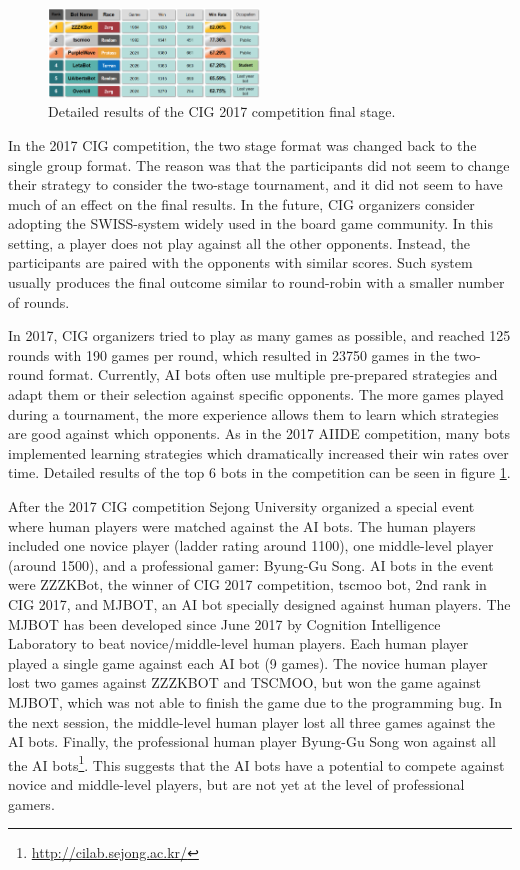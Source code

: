 \begin{figure}[t]
  \centering
  \includegraphics[width=0.5\textwidth]{fig/cig-results.png}
  \caption{Detailed results of the CIG 2017 competition final stage.}
  \label{figCIGresults}
\end{figure}

In the 2017 CIG competition, the two stage format was changed back to the single group format. The reason was that the participants did not seem to change their strategy to consider the two-stage tournament, and it did not seem to have much of an effect on the final results. In the future, CIG organizers consider adopting the SWISS-system widely used in the board game community. In this setting, a player does not play against all the other opponents. Instead, the participants are paired with the opponents with similar scores. Such system usually produces the final outcome similar to round-robin with a smaller number of rounds. 

In 2017, CIG organizers tried to play as many games as possible, and reached 125 rounds with 190 games per round, which resulted in 23750 games in the two-round format. Currently, AI bots often use multiple pre-prepared strategies and adapt them or their selection against specific opponents. The more games played during a tournament, the more experience allows them to learn which strategies are good against which opponents. As in the 2017 AIIDE competition, many bots implemented learning strategies which dramatically increased their win rates over time. Detailed results of the top 6 bots in the competition can be seen in figure \ref{figCIGresults}.

After the 2017 CIG competition Sejong University organized a special event where human players were matched against the AI bots. The human players included one novice player (ladder rating around 1100), one middle-level player (around 1500), and a professional gamer: Byung-Gu Song. AI bots in the event were ZZZKBot, the winner of CIG 2017 competition, tscmoo bot, 2nd rank in CIG 2017, and MJBOT, an AI bot specially designed against human players. The MJBOT has been developed since June 2017 by Cognition Intelligence Laboratory to beat novice/middle-level human players. Each human player played a single game against each AI bot (9 games). The novice human player lost two games against ZZZKBOT and TSCMOO, but won the game against MJBOT, which was not able to finish the game due to the programming bug. In the next session, the middle-level human player lost all three games against the AI bots. Finally, the professional human player Byung-Gu Song won against all the AI bots\footnote{\url{http://cilab.sejong.ac.kr/}}. This suggests that the AI bots have a potential to compete against novice and middle-level players, but are not yet at the level of professional gamers. 

